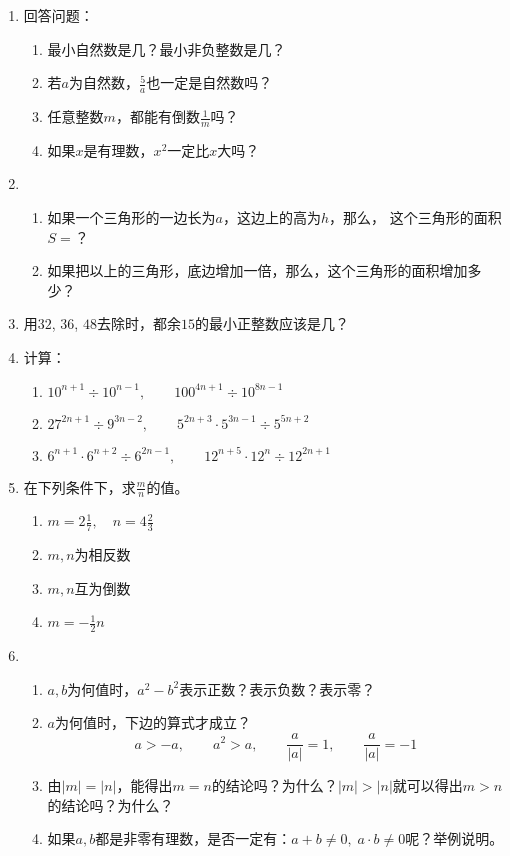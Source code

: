 \begin{enumerate}
	\item 回答问题：
	\begin{enumerate}
		\item 最小自然数是几？最小非负整数是几？
		\item 若$a$为自然数，$\frac{5}{a}$也一定是自然数吗？
		\item 任意整数$m$，都能有倒数$\frac{1}{m}$吗？
		\item 如果$x$是有理数，$x^2$一定比$x$大吗？
	\end{enumerate}
	
	\item \begin{enumerate}
		\item 如果一个三角形的一边长为$a$，这边上的高为$h$，那么，
		这个三角形的面积$S=$？
		\item 如果把以上的三角形，底边增加一倍，那么，这个三角形的面积增加多少？
	\end{enumerate}
	
	\item 用$32$, $36$, $48$去除时，都余$15$的最小正整数应该是几？
	
	\item 计算：
	\begin{enumerate}
		\item $10^{n+1}\div 10^{n-1}  ,\qquad 100^{4n+1}\div 10^{8n-1} $
		\item $27^{2n+1}\div 9^{3n-2}  ,\qquad 5^{2n+3}\cdot 5^{3n-1}\div 5^{5n+2} $
		\item $6^{n+1}\cdot 6^{n+2} \div 6^{2n-1},\qquad 12^{n+5}\cdot 12^n\div 12^{2n+1} $
	\end{enumerate}
	
	\item 在下列条件下，求$\frac{m}{n}$的值。
	\begin{multicols}{2}
		\begin{enumerate}
			\item $m=2\frac{1}{7},\quad n=4\frac{2}{3}$
			\item $m,n$为相反数
			\item $m,n$互为倒数
			\item $m=-\frac{1}{2}n$
		\end{enumerate}
	\end{multicols}
	
	\item  \begin{enumerate}
		\item $a,b$为何值时，$a^2-b^2$表示正数？表示负数？表示零？
		\item $a$为何值时，下边的算式才成立？
		\[a>-a,\qquad a^2>a,\qquad \frac{a}{|a|}=1,\qquad \frac{a}{|a|}=-1\]
		\item 由$|m|=|n|$，能得出$m=n$的结论吗？为什么？$|m|>|n|$就可以得出$m>n$的结论吗？为什么？
		\item 如果$a,b$都是非零有理数，是否一定有：$a+b\ne 0,\; a\cdot b\ne 0$呢？举例说明。
	\end{enumerate}
	

\end{enumerate}
